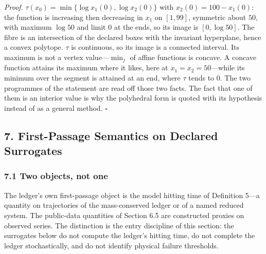 \documentclass[11pt]{article}
\begin{document}
\emph{Proof.} \(\tau(x_0) = \min\{\log x_1(0), \log x_2(0)\}\) with \(x_2(0) = 100 - x_1(0)\): the function is increasing then decreasing in \(x_1\) on \([1, 99]\), symmetric about \(50\), with maximum \(\log 50\) and limit \(0\) at the ends, so its image is \([0, \log 50]\). The fibre is an intersection of the declared boxes with the invariant hyperplane, hence a convex polytope. \(\tau\) is continuous, so its image is a connected interval. Its maximum is not a vertex value---\(\min_j\) of affine functions is concave. A concave function attains its maximum where it likes, here at \(x_1 = x_2 = 50\)---while its minimum over the segment is attained at an end, where \(\tau\) tends to \(0\). The two programmes of the statement are read off those two facts. The fact that one of them is an interior value is why the polyhedral form is quoted with its hypothesis instead of as a general method. \ensuremath{\square} \subsection{7. First-Passage Semantics on Declared
Surrogates}\label{first-passage-semantics-on-declared-surrogates}

\subsubsection{7.1 Two objects, not one}\label{two-objects-not-one}

The ledger's own first-passage object is the model hitting time of
Definition 5---a quantity on trajectories of the mass-conserved ledger
or of a named reduced system. The public-data quantities of Section 6.5
are constructed proxies on observed series. The distinction is the entry
discipline of this section: the surrogates below do not compute the
ledger's hitting time, do not complete the ledger stochastically, and do
not identify physical failure thresholds.
\end{document}
